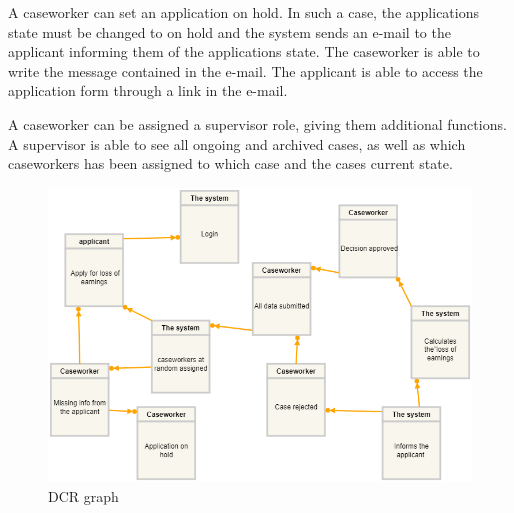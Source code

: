 A caseworker can set an application on hold. In such a case, the applications state must be changed to on hold and the system sends an e-mail to the applicant informing them of the applications state. The caseworker is able to write the message contained in the e-mail. The applicant is able to access the application form through a link in the e-mail.

\vspace{2mm}

A caseworker can be assigned a supervisor role, giving them additional functions. A supervisor is able to see all ongoing and archived cases, as well as which caseworkers has been assigned to which case and the cases current state.
\newpage
\begin{figure}[htb!]
	\includegraphics[width=\textwidth]{DCRcopy}
	\caption{DCR graph}
\end{figure}